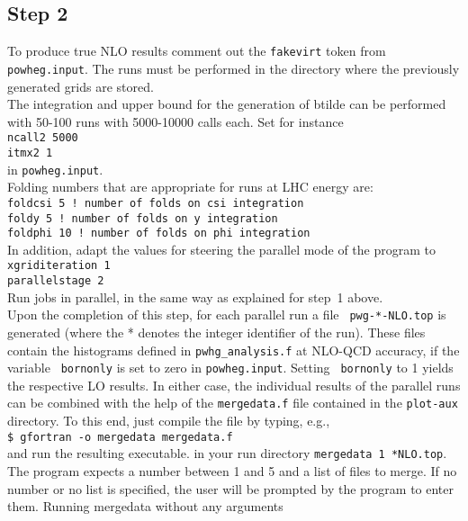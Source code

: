 \documentclass[a4paper,11pt]{article}
\begin{document}
\subsection*{Step 2}
%
To produce true NLO results comment out the {\tt fakevirt} token from {\tt powheg.input}.
The runs must be performed in the directory where the previously generated grids are stored.
\\[2ex]
The integration and upper bound for the generation of btilde can be
performed with 50-100 runs with 5000-10000 calls each. Set for
instance
\\[2ex]
{\tt ncall2 5000}
\\
{\tt itmx2 1}
\\[2ex]
in {\tt powheg.input}.
\\[2ex]
Folding numbers that are appropriate for runs at LHC energy are:
\\[2ex]
{\tt foldcsi 5 ! number of folds on csi integration}
\\
{\tt foldy 5 ! number of folds on y integration}
\\
{\tt foldphi 10 ! number of folds on phi integration}
\\[2ex]
%
In addition, adapt the values for steering the parallel mode of the program to 
\\[2ex]
{\tt xgriditeration   1}
\\
{\tt parallelstage  2}
\\[2ex]
%
Run jobs in parallel, in the same way as explained for step~1 above. 
\\[2ex]
Upon the completion of this step, for each parallel run a file {\tt
  pwg-*-NLO.top} is generated (where the * denotes the integer
identifier of the run).  These files contain the histograms defined in
{\tt pwhg\_analysis.f} at NLO-QCD accuracy, if the variable {\tt
  bornonly} is set to zero in {\tt powheg.input}.  Setting {\tt
  bornonly} to 1 yields the respective LO results. In either case, the
individual results of the parallel runs can be combined with the help
of the {\tt mergedata.f} file contained in the {\tt plot-aux}
directory.  To this end, just compile the file by typing, e.g.,
\\[2ex]
{\tt \$ gfortran -o mergedata mergedata.f}
\\[2ex]
and run the resulting executable. 
 in your run directory
{\tt mergedata 1 *NLO.top}. 
The program expects a number between 1 and 5 and a list of files to
merge. If no number or no list is specified, the user will be prompted
by the program to enter them. Running mergedata without any arguments
\end{document}
